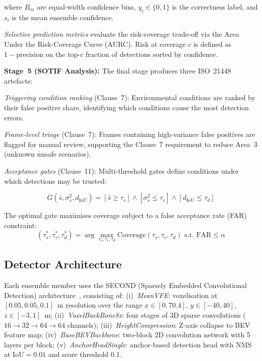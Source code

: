\documentclass[conference]{IEEEtran}
\begin{document}
where $B_m$ are equal-width confidence bins, $y_i \in \{0, 1\}$ is the correctness label, and $s_i$ is the mean ensemble confidence.

\emph{Selective prediction metrics} evaluate the risk-coverage trade-off via the Area Under the Risk-Coverage Curve (AURC). Risk at coverage $c$ is defined as $1 - \text{precision}$ on the top-$c$ fraction of detections sorted by confidence.

\textbf{Stage~5 (SOTIF Analysis):} The final stage produces three ISO~21448 artefacts:

\emph{Triggering condition ranking} (Clause~7): Environmental conditions are ranked by their false positive share, identifying which conditions cause the most detection errors.

\emph{Frame-level triage} (Clause~7): Frames containing high-variance false positives are flagged for manual review, supporting the Clause~7 requirement to reduce Area~3 (unknown unsafe scenarios).

\emph{Acceptance gates} (Clause~11): Multi-threshold gates define conditions under which detections may be trusted:

\begin{equation}
G(\bar{s}, \sigma^2_s, d_{\text{IoU}}) = \left[\bar{s} \geq \tau_s\right] \wedge \left[\sigma^2_s \leq \tau_v\right] \wedge \left[d_{\text{IoU}} \leq \tau_d\right]
\label{eq:gate}
\end{equation}

The optimal gate maximises coverage subject to a false acceptance rate (FAR) constraint:
\begin{equation}
(\tau^*_s, \tau^*_v, \tau^*_d) = \arg\max_{\tau_s, \tau_v, \tau_d} \text{Coverage}(\tau_s, \tau_v, \tau_d) \text{ s.t. } \text{FAR} \leq \alpha
\label{eq:optimal_gate}
\end{equation}

\subsection{Detector Architecture}

Each ensemble member uses the SECOND (Sparsely Embedded Convolutional Detection) architecture~\cite{yan2018second}, consisting of: (i)~\emph{MeanVFE}: voxelisation at $[0.05, 0.05, 0.1]$~m resolution over the range $x \in [0, 70.4]$, $y \in [-40, 40]$, $z \in [-3, 1]$~m; (ii)~\emph{VoxelBackBone8x}: four stages of 3D sparse convolutions ($16 \to 32 \to 64 \to 64$ channels); (iii)~\emph{HeightCompression}: Z-axis collapse to BEV feature map; (iv)~\emph{BaseBEVBackbone}: two-block 2D convolution network with 5 layers per block; (v)~\emph{AnchorHeadSingle}: anchor-based detection head with NMS at IoU${=}0.01$ and score threshold 0.1.
\end{document}

